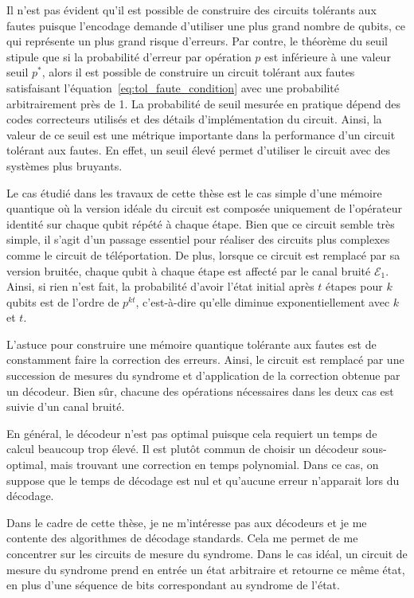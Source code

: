 Il n'est pas évident qu'il est possible de construire des circuits tolérants aux fautes
puisque l'encodage demande d'utiliser une plus grand nombre de qubits,
ce qui représente un plus grand risque d'erreurs.
Par contre,
le théorème du seuil~\cite{aharonov_fault-tolerant_1999} stipule que si la probabilité d'erreur
par opération $p$ est inférieure à une valeur seuil $p^*$,
alors il est possible de construire un circuit tolérant aux fautes satisfaisant
l'équation~\ref{eq:tol_faute_condition} avec une probabilité arbitrairement près de 1.
La probabilité de seuil mesurée en pratique dépend des codes correcteurs utilisés
et des détails d'implémentation du circuit.
Ainsi,
la valeur de ce seuil est une métrique importante dans la performance d'un circuit tolérant aux fautes.
En effet,
un seuil élevé permet d'utiliser le circuit avec des systèmes plus bruyants.

Le cas étudié dans les travaux de cette thèse est le cas simple d'une mémoire quantique 
où la version idéale du circuit est composée uniquement de l'opérateur identité sur chaque qubit répété à chaque étape.
Bien que ce circuit semble très simple,
il s'agit d'un passage essentiel pour réaliser des circuits plus complexes comme le circuit
de téléportation.
De plus,
lorsque ce circuit est remplacé par sa version bruitée,
chaque qubit à chaque étape est affecté par le canal bruité $\mathcal E_1$.
Ainsi,
si rien n'est fait,
la probabilité d'avoir l'état initial après $t$ étapes pour $k$ qubits est de l'ordre de $p^{kt}$,
c'est-à-dire qu'elle diminue exponentiellement avec $k$ et $t$.

L'astuce pour construire une mémoire quantique tolérante aux fautes
est de constamment faire la correction des erreurs.
Ainsi,
le circuit est remplacé par une succession de mesures du syndrome
et d'application de la correction obtenue par un décodeur.
Bien sûr, 
chacune des opérations nécessaires dans les deux cas est suivie d'un canal bruité.

En général,
le décodeur n'est pas optimal puisque cela requiert un temps de calcul beaucoup trop élevé.
Il est plutôt commun de choisir un décodeur sous-optimal,
mais trouvant une correction en temps polynomial.
Dans ce cas,
on suppose que le temps de décodage est nul 
et qu'aucune erreur n'apparait lors du décodage.

Dans le cadre de cette thèse,
je ne m'intéresse pas aux décodeurs et je me contente des algorithmes de décodage standards.
Cela me permet de me concentrer sur les circuits de mesure du syndrome.
Dans le cas idéal,
un circuit de mesure du syndrome prend en entrée un état arbitraire et retourne ce même état,
en plus d'une séquence de bits correspondant au syndrome de l'état.

